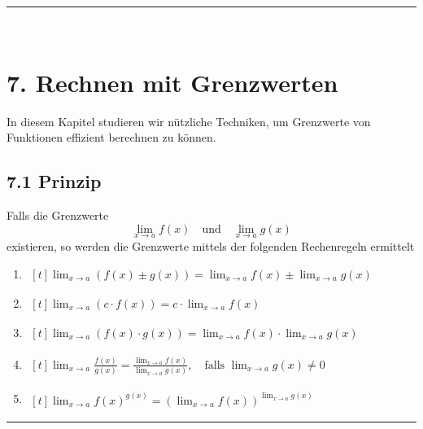 \documentclass[a4paper,landscape,8pt]{extarticle}
\newcommand{\sep}{\vspace{5pt}\noindent\hrule\vspace{5pt}}
\renewcommand*{\newpage}{ \ }
\begin{document}
\begin{multicols*}{4}
\begin{warmup}
\sep

\end{warmup}



\newpage

\section{7. Rechnen mit Grenzwerten}

In diesem Kapitel studieren wir nützliche Techniken, um Grenzwerte von
Funktionen effizient berechnen zu können.

\subsection{7.1 Prinzip}

\Satz Falls die Grenzwerte
\[
\lim_{x\to a} f(x) \quad \text{und} \quad \lim_{x\to a} g(x)
\]
existieren, so werden die Grenzwerte mittels der folgenden Rechenregeln
ermittelt

\begin{enumerate}[label=\arabic*)]
  \itemsep5px 
  \item $\begin{aligned}[t]
  \lim_{x\to a} \left(f(x) \pm g(x)\right)
  =
  \lim_{x\to a} f(x) \pm \lim_{x\to a} g(x)
  \end{aligned}$
  \item $\begin{aligned}[t]
  \lim_{x\to a} \left(c\cdot f(x)\right)
  = c\cdot \lim_{x\to a} f(x)
  \end{aligned}$
  \item $\begin{aligned}[t]
  \lim_{x\to a} \left(f(x) \cdot g(x)\right)
  =
  \lim_{x\to a} f(x) \cdot \lim_{x\to a} g(x)
  \end{aligned}$
  \item $\begin{aligned}[t]
  \lim_{x\to a} \frac{f(x)}{g(x)}
  =
  \frac{\lim_{x\to a} f(x)}{\lim_{x\to a} g(x)}, \quad \text{falls }\lim_{x\to
  a} g(x)\neq 0
  \end{aligned}$
  \item $\begin{aligned}[t]
  \lim_{x\to a} f(x)^{g(x)}
  =
  \left(\lim_{x\to a} f(x)\right)^{\lim_{x\to a} g(x)}
  \end{aligned}$
\end{enumerate}

\sep


\end{multicols*}
\end{document}
